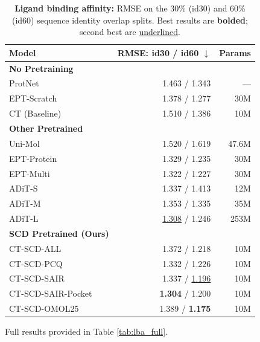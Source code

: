 \begin{table}[h]
\centering
\caption{\textbf{Ligand binding affinity:} RMSE on the 30\% (id30) and 60\% (id60) sequence identity overlap splits. Best results are \textbf{bolded}; second best are \underline{underlined}. }
\label{tab:lba_brief}
\small
\begin{tabular*}{\columnwidth}{@{\extracolsep{\fill}}l r r}
\toprule
\textbf{Model} & \textbf{RMSE: id30 / id60} $\downarrow$ & \textbf{Params} \\
\midrule
\textbf{No Pretraining} \\
ProtNet \cite{ProtNet_wang2023} & 1.463 / 1.343 & --- \\
EPT-Scratch \cite{EPT_jiao2025} & 1.378 / 1.277 & 30M \\
CT (Baseline) & 1.510 / 1.386 & 10M \\
\midrule
\textbf{Other Pretrained} \\
Uni-Mol \cite{UniMol_Zhou2023} & 1.520 / 1.619 & 47.6M \\
EPT-Protein \cite{EPT_jiao2025} & 1.329 / 1.235 & 30M \\
EPT-Multi \cite{EPT_jiao2025} & 1.322 / 1.227 & 30M \\
ADiT-S \cite{lba-adit} & 1.337 / 1.413 & 12M \\
ADiT-M \cite{lba-adit} & 1.353 / 1.335 & 35M \\
ADiT-L \cite{lba-adit} & \underline{1.308} / 1.246 & 253M \\
\midrule
\textbf{SCD Pretrained (Ours)} \\
CT-SCD-ALL & 1.372 / 1.218 & 10M \\
CT-SCD-PCQ & 1.332 / 1.226 & 10M \\
CT-SCD-SAIR & 1.337 / \underline{1.196} & 10M \\
CT-SCD-SAIR-Pocket & \textbf{1.304} / 1.200 & 10M \\
CT-SCD-OMOL25 & 1.389 / \textbf{1.175} & 10M \\
\bottomrule
\end{tabular*}
\footnotesize Full results provided in Table \ref{tab:lba_full}.
\end{table}


